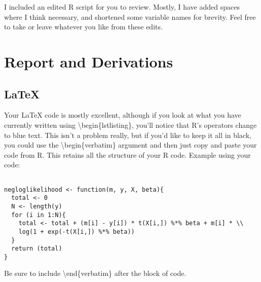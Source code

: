 \documentclass[12pt, oneside]{article}   	%
\begin{document}
I included an edited R script for you to review. Mostly, I have added spaces where I think necessary, and shortened some variable names for brevity. Feel free to take or leave whatever you like from these edits.


\section{Report and Derivations}
\subsection{LaTeX}
Your LaTeX code is mostly excellent, although if you look at what you have currently written using \textbackslash begin\{lstlisting\}, you'll notice that R's operators change to blue text. This isn't a problem really, but if you'd like to keep it all in black, you could use the \textbackslash begin\{verbatim\} argument and then just copy and paste your code from R. This retains all the structure of your R code. Example using your code: 

\begin{verbatim}

negloglikelihood <- function(m, y, X, beta){ 
  total <- 0
  N <- length(y)
  for (i in 1:N){
    total <- total + (m[i] - y[i]) * t(X[i,]) %*% beta + m[i] * \\
    log(1 + exp(-t(X[i,]) %*% beta))
  }
  return (total)
}
\end{verbatim}
Be sure to include \textbackslash end\{verbatim\} after the block of code.
\end{document}
